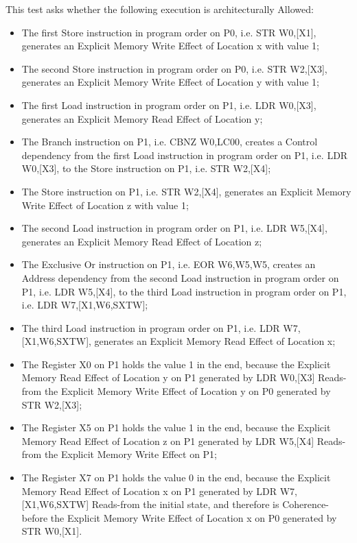 This test asks whether the following execution is architecturally Allowed:

\begin{itemize}
  \item The first Store instruction in program order on P0, i.e. STR W0,[X1], generates an Explicit Memory Write Effect of Location x with value 1;
  \item The second Store instruction in program order on P0, i.e. STR W2,[X3], generates an Explicit Memory Write Effect of Location y with value 1;
  \item The first Load instruction in program order on P1, i.e. LDR W0,[X3], generates an Explicit Memory Read Effect of Location y;
  \item The Branch instruction on P1, i.e. CBNZ W0,LC00, creates a Control dependency from the first Load instruction in program order on P1, i.e. LDR W0,[X3], to the Store instruction on P1, i.e. STR W2,[X4];
  \item The Store instruction on P1, i.e. STR W2,[X4], generates an Explicit Memory Write Effect of Location z with value 1;
  \item The second Load instruction in program order on P1, i.e. LDR W5,[X4], generates an Explicit Memory Read Effect of Location z;
  \item The Exclusive Or instruction on P1, i.e. EOR W6,W5,W5, creates an Address dependency from the second Load instruction in program order on P1, i.e. LDR W5,[X4], to the third Load instruction in program order on P1, i.e. LDR W7,[X1,W6,SXTW];
  \item The third Load instruction in program order on P1, i.e. LDR W7,[X1,W6,SXTW], generates an Explicit Memory Read Effect of Location x;
  \item The Register X0 on P1 holds the value 1 in the end, because the Explicit Memory Read Effect of Location y on P1 generated by LDR W0,[X3] Reads-from the Explicit Memory Write Effect of Location y on P0 generated by STR W2,[X3];
  \item The Register X5 on P1 holds the value 1 in the end, because the Explicit Memory Read Effect of Location z on P1 generated by LDR W5,[X4] Reads-from the Explicit Memory Write Effect on P1;
  \item The Register X7 on P1 holds the value 0 in the end, because the Explicit Memory Read Effect of Location x on P1 generated by LDR W7,[X1,W6,SXTW] Reads-from the initial state, and therefore is Coherence-before the Explicit Memory Write Effect of Location x on P0 generated by STR W0,[X1].
\end{itemize}
